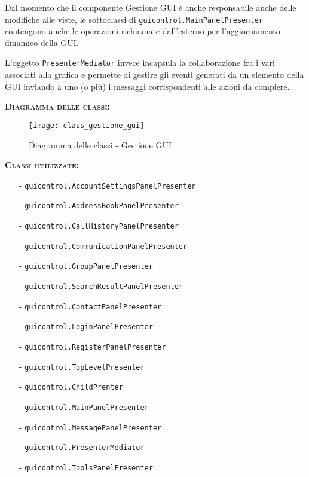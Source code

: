 \begin{description}
Dal momento che il componente \textsf{Gestione GUI} è anche responsabile anche delle modifiche alle viste, le sottoclassi di \texttt{guicontrol.MainPanelPresenter} contengono anche le operazioni richiamate dall'esterno per l'aggiornamento dinamico della GUI\@.

L'oggetto \texttt{PresenterMediator} invece incapsula la collaborazione fra i vari  associati alla grafica e permette di gestire gli eventi generati da un elemento della GUI inviando a uno (o più)  i messaggi corrispondenti alle azioni da compiere.

	\item{\scshape\bfseries Diagramma delle classi:}\\
  \begin{figure}[H]
    \centering
    \texttt{[image: class\_gestione\_gui]}
    \caption{Diagramma delle classi - Gestione GUI}\label{fig:gestionegui}
  \end{figure}

	\item{\scshape\bfseries Classi utilizzate:}\\
	\begin{itemize}[noitemsep,nolistsep]
	  \item[-] \texttt{guicontrol.AccountSettingsPanelPresenter}
	  \item[-] \texttt{guicontrol.AddressBookPanelPresenter}
	  \item[-] \texttt{guicontrol.CallHistoryPanelPresenter}
	  \item[-] \texttt{guicontrol.CommunicationPanelPresenter}
	  \item[-] \texttt{guicontrol.GroupPanelPresenter}	 
	  \item[-] \texttt{guicontrol.SearchResultPanelPresenter}	   
	  \item[-] \texttt{guicontrol.ContactPanelPresenter}
	  \item[-] \texttt{guicontrol.LoginPanelPresenter}
	  \item[-] \texttt{guicontrol.RegisterPanelPresenter}	 
	  \item[-] \texttt{guicontrol.TopLevelPresenter}	  
	  \item[-] \texttt{guicontrol.ChildPrenter}	  
	  \item[-] \texttt{guicontrol.MainPanelPresenter}
		\item[-] \texttt{guicontrol.MessagePanelPresenter}
		\item[-] \texttt{guicontrol.PresenterMediator}
	  \item[-] \texttt{guicontrol.ToolsPanelPresenter}
	\end{itemize}
\end{description}

